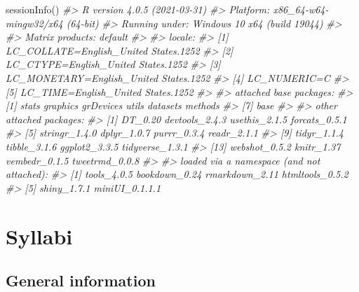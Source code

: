\documentclass[
]{book}
\newenvironment{Shaded}{\begin{snugshade}}{\end{snugshade}}
\newcommand{\CommentTok}[1]{\textcolor[rgb]{0.56,0.35,0.01}{\textit{#1}}}
\newcommand{\FunctionTok}[1]{\textcolor[rgb]{0.00,0.00,0.00}{#1}}
\newcommand{\NormalTok}[1]{#1}
\begin{document}
\begin{Shaded}
\begin{Highlighting}[]
\FunctionTok{sessionInfo}\NormalTok{()}
\CommentTok{\#\textgreater{} R version 4.0.5 (2021{-}03{-}31)}
\CommentTok{\#\textgreater{} Platform: x86\_64{-}w64{-}mingw32/x64 (64{-}bit)}
\CommentTok{\#\textgreater{} Running under: Windows 10 x64 (build 19044)}
\CommentTok{\#\textgreater{} }
\CommentTok{\#\textgreater{} Matrix products: default}
\CommentTok{\#\textgreater{} }
\CommentTok{\#\textgreater{} locale:}
\CommentTok{\#\textgreater{} [1] LC\_COLLATE=English\_United States.1252 }
\CommentTok{\#\textgreater{} [2] LC\_CTYPE=English\_United States.1252   }
\CommentTok{\#\textgreater{} [3] LC\_MONETARY=English\_United States.1252}
\CommentTok{\#\textgreater{} [4] LC\_NUMERIC=C                          }
\CommentTok{\#\textgreater{} [5] LC\_TIME=English\_United States.1252    }
\CommentTok{\#\textgreater{} }
\CommentTok{\#\textgreater{} attached base packages:}
\CommentTok{\#\textgreater{} [1] stats     graphics  grDevices utils     datasets  methods  }
\CommentTok{\#\textgreater{} [7] base     }
\CommentTok{\#\textgreater{} }
\CommentTok{\#\textgreater{} other attached packages:}
\CommentTok{\#\textgreater{}  [1] DT\_0.20         devtools\_2.4.3  usethis\_2.1.5   forcats\_0.5.1  }
\CommentTok{\#\textgreater{}  [5] stringr\_1.4.0   dplyr\_1.0.7     purrr\_0.3.4     readr\_2.1.1    }
\CommentTok{\#\textgreater{}  [9] tidyr\_1.1.4     tibble\_3.1.6    ggplot2\_3.3.5   tidyverse\_1.3.1}
\CommentTok{\#\textgreater{} [13] webshot\_0.5.2   knitr\_1.37      vembedr\_0.1.5   tweetrmd\_0.0.8 }
\CommentTok{\#\textgreater{} }
\CommentTok{\#\textgreater{} loaded via a namespace (and not attached):}
\CommentTok{\#\textgreater{} [1] tools\_4.0.5     bookdown\_0.24   rmarkdown\_2.11  htmltools\_0.5.2}
\CommentTok{\#\textgreater{} [5] shiny\_1.7.1     miniUI\_0.1.1.1}
\end{Highlighting}
\end{Shaded}

\hypertarget{part-syllabi}{%
\part*{Syllabi}\label{part-syllabi}}

\hypertarget{general-information}{%
\chapter*{General information}\label{general-information}}
\end{document}
